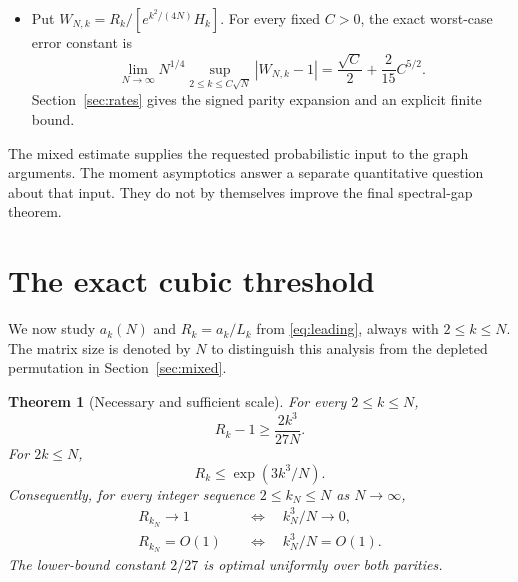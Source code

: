 \documentclass[11pt]{article}
\newtheorem{theorem}{Theorem}[section]
\theoremstyle{definition}
\theoremstyle{remark}
\newcommand{\1}{\mathbf 1}
\begin{document}
\begin{itemize}
\[
R_k\sim H_k\exp\{NG(\sqrt{k/N})\},\qquad
G(t)=\sum_{j\ge4}\frac{2t^j}{j(j-2)},
\]
uniformly throughout every sublinear upper range. Its first terms give sharp relative-accuracy thresholds $N^{1/2}$, $N^{3/5}$ and $N^{2/3}$. Theorem~\ref{thm:global} gives the approximation $\mathcal A_{N,k}$ at every order by keeping the denominator exact. Its optimal worst-case relative error is $C_*N^{-1/3}+o(N^{-1/3})$, where $C_*\approx0.39549627$. The full parity profile locates the largest error at odd orders near $1.1654N^{1/3}$.
\item Put $W_{N,k}=R_k/[e^{k^2/(4N)}H_k]$. For every fixed $C>0$, the exact worst-case error constant is
\[
\lim_{N\to\infty}N^{1/4}
\sup_{2\le k\le C\sqrt N}|W_{N,k}-1|
=\frac{\sqrt C}{2}+\frac{2}{15}C^{5/2}.
\]
Section~\ref{sec:rates} gives the signed parity expansion and an explicit finite bound.
\end{itemize}

The mixed estimate supplies the requested probabilistic input to the graph arguments. The moment asymptotics answer a separate quantitative question about that input. They do not by themselves improve the final spectral-gap theorem.


\clearpage
\section{The exact cubic threshold}\label{sec:threshold}

We now study $a_k(N)$ and $R_k=a_k/L_k$ from \eqref{eq:leading}, always with $2\le k\le N$. The matrix size is denoted by $N$ to distinguish this analysis from the depleted permutation in Section~\ref{sec:mixed}.

\begin{theorem}[Necessary and sufficient scale]\label{thm:threshold}
For every $2\le k\le N$,
\begin{equation}\label{eq:lower}
R_k-1\ge\frac{2k^3}{27N}.
\end{equation}
For $2k\le N$,
\begin{equation}\label{eq:upper}
R_k\le\exp(3k^3/N).
\end{equation}
Consequently, for every integer sequence $2\le k_N\le N$ as $N\to\infty$,
\begin{align}
R_{k_N}\to1&\quad\Longleftrightarrow\quad k_N^3/N\to0,\label{eq:iff}\\
R_{k_N}=O(1)&\quad\Longleftrightarrow\quad k_N^3/N=O(1).\label{eq:bounded}
\end{align}
The lower-bound constant $2/27$ is optimal uniformly over both parities.
\end{theorem}
\end{document}
